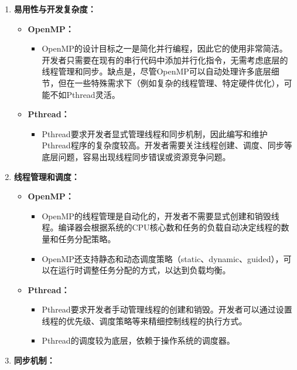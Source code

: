 \documentclass{nku}
\begin{document}
\begin{enumerate}
\begin{itemize}
\begin{itemize}
        \end{itemize}
    \end{itemize}
    \item \textbf{易用性与开发复杂度：}
    \begin{itemize}
        \item \textbf{OpenMP：} 
        \begin{itemize}
            \item OpenMP的设计目标之一是简化并行编程，因此它的使用非常简洁。开发者只需要在现有的串行代码中添加并行化指令，无需考虑底层的线程管理和同步。缺点是，尽管OpenMP可以自动处理许多底层细节，但在一些特殊需求下（例如复杂的线程管理、特定硬件优化），可能不如Pthread灵活。
        \end{itemize}
        \item \textbf{Pthread：}
        \begin{itemize}
            \item Pthread要求开发者显式管理线程和同步机制，因此编写和维护Pthread程序的复杂度较高。开发者需要关注线程创建、调度、同步等底层问题，容易出现线程同步错误或资源竞争问题。
        \end{itemize}
    \end{itemize}
    \item \textbf{线程管理和调度：}
    \begin{itemize}
        \item \textbf{OpenMP：}   
        \begin{itemize}
            \item OpenMP的线程管理是自动化的，开发者不需要显式创建和销毁线程。编译器会根据系统的CPU核心数和任务的负载自动决定线程的数量和任务分配策略。
            \item OpenMP还支持静态和动态调度策略（static、dynamic、guided），可以在运行时调整任务分配的方式，以达到负载均衡。
        \end{itemize}
        \item \textbf{Pthread：}
        \begin{itemize}
            \item Pthread要求开发者手动管理线程的创建和销毁。开发者可以通过设置线程的优先级、调度策略等来精细控制线程的执行方式。
            \item Pthread的调度较为底层，依赖于操作系统的调度器。
        \end{itemize}
    \end{itemize}
    \item \textbf{同步机制：}
    \begin{itemize}

\end{itemize}
\end{enumerate}
\end{document}
